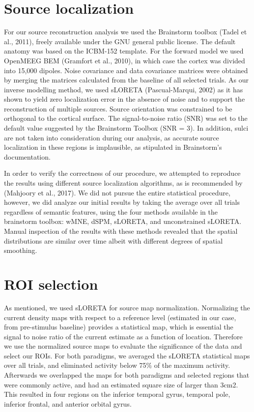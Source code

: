 \section{Source localization}
For our source reconstruction analysis we used the Brainstorm toolbox (Tadel et al., 2011), freely available under the GNU general public license. The default anatomy was based on the ICBM-152 template. For the forward model we used OpenMEEG BEM (Gramfort et al., 2010), in which case the cortex was divided into 15,000 dipoles. Noise covariance and data covariance matrices were obtained by merging the matrices calculated from the baseline of all selected trials. As our inverse modelling method, we used sLORETA (Pascual-Marqui, 2002) as it has shown to yield zero localization error in the absence of noise and to support the reconstruction of multiple sources. Source orientation was constrained to be orthogonal to the cortical surface. The signal-to-noise ratio (SNR) was set to the default value suggested by the Brainstorm Toolbox (SNR = 3). In addition, sulci are not taken into consideration during our analysis, as accurate source localization in these regions is implausible, as stipulated in Brainstorm's documentation.

In order to verify the correctness of our procedure, we attempted to reproduce the results using different source localization algorithms, as is recommended by (Mahjoory et al., 2017). We did not pursue the entire statistical procedure, however, we did analyze our initial results by taking the average over all trials regardless of semantic features, using the four methods available in the brainstorm toolbox: wMNE, dSPM, sLORETA, and unconstrained sLORETA. Manual inspection of the results with these methods revealed that the spatial distributions are similar over time albeit with different degrees of spatial smoothing.

\section{ROI selection}

As mentioned, we used sLORETA for source map normalization. Normalizing the current density maps with respect to a reference level (estimated in our case, from pre-stimulus baseline) provides a statistical map, which is essential the signal to noise ratio of the current estimate as a function of location. Therefore we use the normalized source maps to evaluate the significance of the data and select our ROIs. For both paradigms, we averaged the sLORETA statistical maps over all trials, and eliminated activity below 75\% of the maximum activity. Afterwards we overlapped the maps for both paradigms and selected regions that were commonly active, and had an estimated square size of larger than 3cm2. This resulted in four regions on the inferior temporal gyrus, temporal pole, inferior frontal, and anterior orbital gyrus.

